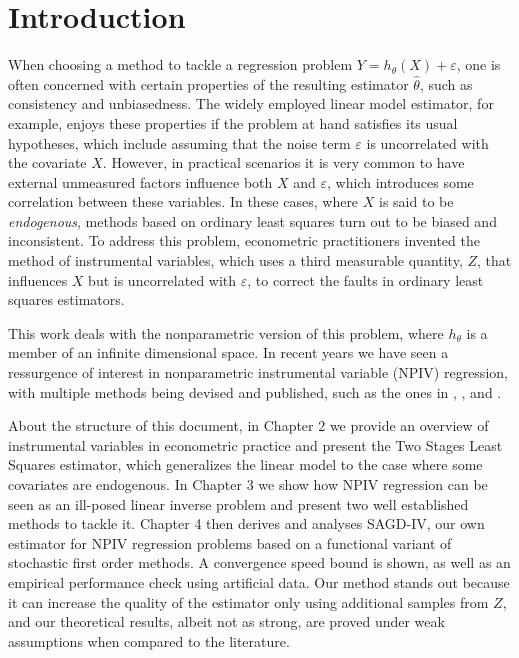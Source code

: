 \chapter{Introduction}

When choosing a method to tackle a regression problem $ Y = h_{ \theta } ( X ) + \varepsilon $, one is often concerned with certain properties of the resulting estimator $ \hat{ \theta } $, such as consistency and unbiasedness.
The widely employed linear model estimator, for example, enjoys these properties if the problem at hand satisfies its usual hypotheses, which include assuming that the noise term $ \varepsilon $ is uncorrelated with the covariate $ X $.
However, in practical scenarios it is very common to have external unmeasured factors influence both $ X $ and $ \varepsilon $, which introduces some correlation between these variables.
In these cases, where $ X $ is said to be \emph{endogenous}, methods based on ordinary least squares turn out to be biased and inconsistent.
To address this problem, econometric practitioners invented the method of instrumental variables, which uses a third measurable quantity, $ Z $, that influences $ X $ but is uncorrelated with $ \varepsilon $, to correct the faults in ordinary least squares estimators.

This work deals with the nonparametric version of this problem, where $ h_{ \theta } $ is a member of an infinite dimensional space.
In recent years we have seen a ressurgence of interest in nonparametric instrumental variable (NPIV) regression, with multiple methods being devised and published, such as the ones in \cite{singh2019}, \cite{deepiv2017}, \cite{deepgmm2019} and \cite{dualiv2020}.

About the structure of this document, in Chapter 2 we provide an overview of instrumental variables in econometric practice and present the Two Stages Least Squares estimator, which generalizes the linear model to the case where some covariates are endogenous.
In Chapter 3 we show how NPIV regression can be seen as an ill-posed linear inverse problem and present two well established methods to tackle it.
Chapter 4 then derives and analyses SAGD-IV, our own estimator for NPIV regression problems based on a functional variant of stochastic first order methods.
A convergence speed bound is shown, as well as an empirical performance check using artificial data.
Our method stands out because it can increase the quality of the estimator only using additional samples from $ Z $, and our theoretical results, albeit not as strong, are proved under weak assumptions when compared to the literature.
